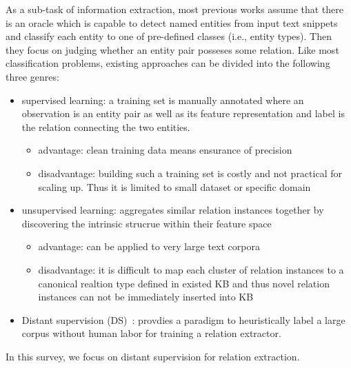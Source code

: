 \documentclass[10pt]{article} %
\theoremstyle{definition}
\theoremstyle{definition}
\begin{document}
As a sub-task of information extraction, most previous works assume that there is an oracle which is capable to detect named entities from input text snippets and classify each entity to one of pre-defined classes (i.e., entity types). 
Then they focus on judging whether an entity pair posseses some relation. 
Like most classification problems, existing approaches can be divided into the following three genres: 
\begin{itemize}
\item supervised learning: a training set is manually annotated where an observation is an entity pair as well as its feature representation and label is the relation connecting the two entities. 
	\begin{itemize}
	\item advantage: clean training data means ensurance of precision 
	\item disadvantage: building such a training set is costly and not practical for scaling up. Thus it is limited to small dataset or specific domain
	\end{itemize}
\item unsupervised learning: aggregates similar relation instances together by discovering the intrinsic strucrue within their feature space 
	\begin{itemize}
	\item advantage: can be applied to very large text corpora 
	\item disadvantage: it is difficult to map each cluster of relation instances to a canonical realtion type defined in existed KB and thus novel relation instances can not be immediately inserted into KB
	\end{itemize}
\item Distant supervision (DS)~\cite{mintz}: provdies a paradigm to heuristically label a large corpus without human labor for training a relation extractor. 
\end{itemize}
In this survey, we focus on distant supervision for relation extraction. 
\end{document}

